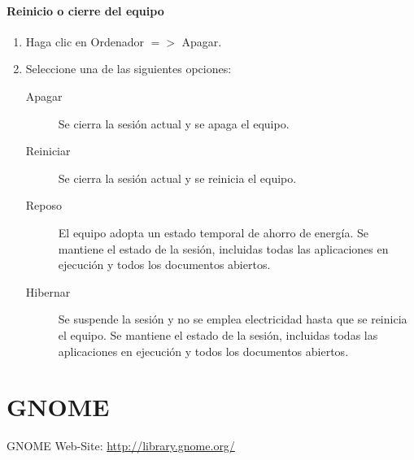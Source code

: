 \documentclass[12pt,letterpaper]{book}
\begin{document}
\subsection{Reinicio o cierre del equipo}
\begin{enumerate}
\item Haga clic en Ordenador $=>$ Apagar. 
\item Seleccione una de las siguientes opciones:
\begin{description}
\item[Apagar] Se cierra la sesión actual y se apaga el equipo.
\item[Reiniciar] Se cierra la sesión actual y se reinicia el equipo.
\item[Reposo] El equipo adopta un estado temporal de ahorro de energía. Se mantiene el estado de la sesión, incluidas todas las aplicaciones en ejecución y todos los documentos abiertos.
\item[Hibernar] Se suspende la sesión y no se emplea electricidad hasta que se reinicia el equipo. Se mantiene el estado de la sesión, incluidas todas las aplicaciones en ejecución y todos los documentos abiertos.
\end{description}
\end{enumerate}
\part{GNOME}






\begin{thebibliography}{5}
 GNOME Web-Site: \url{http://library.gnome.org/}
\end{thebibliography}
\end{document}
